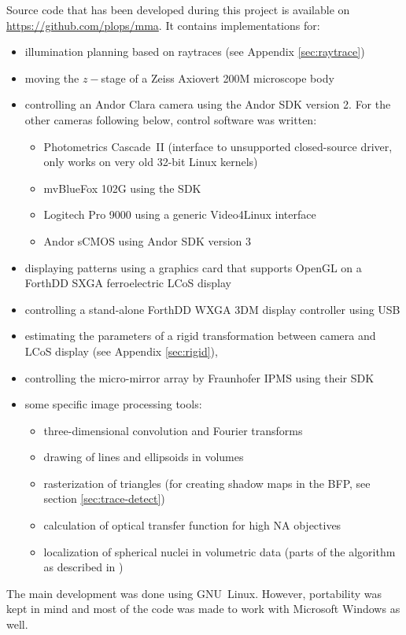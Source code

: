 \documentclass[oneside,a4paper,12pt,BCOR20mm,DIV14]{scrbook}
\begin{document}
Source code that has been developed during this project is available
on \url{https://github.com/plops/mma}.  It contains implementations
for:
\begin{itemize}
\item illumination planning based on raytraces (see Appendix
  \ref{sec:raytrace})
\item moving the $z-$stage of a Zeiss Axiovert 200M microscope body
\item controlling an Andor Clara camera using the Andor SDK version
  2. For the other cameras following below, control software was written:
  \begin{itemize}
  \item Photometrics Cascade~II (interface to unsupported
    closed-source driver, only works on very old 32-bit Linux kernels)
  \item mvBlueFox 102G using the SDK
  \item Logitech Pro 9000 using a generic Video4Linux interface
  \item Andor sCMOS using Andor SDK version 3
  \end{itemize}
\item displaying patterns using a graphics card that supports OpenGL
  on a ForthDD SXGA ferroelectric LCoS display
\item controlling a stand-alone ForthDD WXGA 3DM display controller
  using USB
\item estimating the parameters of a rigid transformation between
  camera and LCoS display (see Appendix \ref{sec:rigid}),
\item controlling the micro-mirror array by Fraunhofer IPMS using
  their SDK
\item some specific image processing tools:
  \begin{itemize}
  \item three-dimensional convolution and Fourier transforms
  \item drawing of lines and ellipsoids in volumes
  \item rasterization of triangles (for creating shadow maps in the
    BFP, see section \ref{sec:trace-detect})
  \item calculation of optical transfer function for high NA
    objectives
  \item localization of spherical nuclei in volumetric data (parts of
    the algorithm as described in \citet{Santella2010})
  \end{itemize}
\end{itemize}
The main development was done using GNU~Linux. However, portability
was kept in mind and most of the code was made to work with Microsoft
Windows as well.
\end{document}
